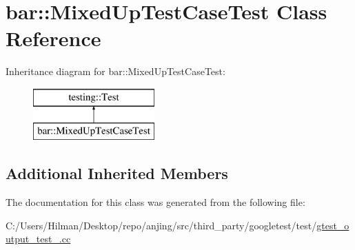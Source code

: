 \hypertarget{classbar_1_1_mixed_up_test_case_test}{}\section{bar\+:\+:Mixed\+Up\+Test\+Case\+Test Class Reference}
\label{classbar_1_1_mixed_up_test_case_test}
Inheritance diagram for bar\+:\+:Mixed\+Up\+Test\+Case\+Test\+:\begin{figure}[H]
\begin{center}
\leavevmode
\includegraphics[height=2.000000cm]{classbar_1_1_mixed_up_test_case_test}
\end{center}
\end{figure}
\subsection*{Additional Inherited Members}


The documentation for this class was generated from the following file\+:\begin{DoxyCompactItemize}
\item 
C\+:/\+Users/\+Hilman/\+Desktop/repo/anjing/src/third\+\_\+party/googletest/test/\hyperlink{gtest__output__test___8cc}{gtest\+\_\+output\+\_\+test\+\_\+.\+cc}\end{DoxyCompactItemize}
